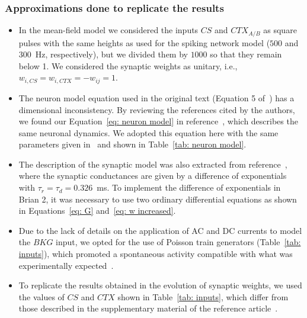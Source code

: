 \subsubsection*{Approximations done to replicate the results}
\begin{itemize}

    \item In the mean-field model we considered the inputs $CS$ and $CTX_{A/B}$ as square pulses with the same heights as used for the spiking network model ($500$ and $300$~Hz, respectively), but we divided them by $1000$ so that they remain below 1. We considered the synaptic weights as unitary, i.e., $w_{i,CS} = w_{i,CTX} = -w_{ij} = 1$.
    
    \item The neuron model equation used in the original text (Equation 5 of~\cite{Vlachos2011}) has a dimensional inconsistency. By reviewing the references cited by the authors, we found our Equation~\ref{eq: neuron model} in reference~\cite{kumar2008high}, which describes the same neuronal dynamics. We adopted this equation here with the same parameters given in~\cite{kumar2008high} and shown in Table~\ref{tab: neuron model}.
    
    \item The description of the synaptic model was also extracted from reference~\cite{kumar2008high}, where the synaptic conductances are given by a difference of exponentials with $\tau_r = \tau_d = 0.326$~ms. To implement the difference of exponentials in Brian 2, it was necessary to use two ordinary differential equations as shown in Equations~\ref{eq: G} and~\ref{eq: w increased}.
    
    
    \item Due to the lack of details on the application of AC and DC currents to model the $BKG$ input, we opted for the use of Poisson train generators (Table~\ref{tab: inputs}), which promoted a spontaneous activity compatible with what was experimentally expected~\cite{sah2003amygdaloid}.
    
    \item To replicate the results obtained in the evolution of synaptic weights, we used the values of $CS$ and $CTX$ shown in Table~\ref{tab: inputs}, which differ from those described in the supplementary material of the reference article~\cite{Vlachos2011}.
    

\end{itemize}
